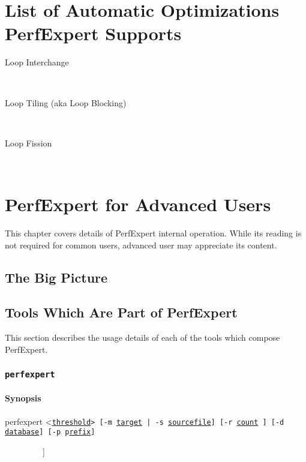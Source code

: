 \chapter{List of Automatic Optimizations PerfExpert Supports}

\begin{description}
	\item[Loop Interchange]\hfill \\
	\item[Loop Tiling (aka Loop Blocking)]\hfill \\
	\item[Loop Fission]\hfill \\

\end{description}

\chapter{PerfExpert for Advanced Users}

This chapter covers details of PerfExpert internal operation. While its reading is not required for common users, advanced user may appreciate its content.

\section{The Big Picture}

\section{Tools Which Are Part of PerfExpert}

This section describes the usage details of each of the tools which compose PerfExpert.

\subsection{\texttt{perfexpert}}

\subsubsection{Synopsis}


\btt perfexpert <\tt\underline{threshold}\btt> [-m \tt\underline{tar}g\underline{et} \btt | -s \tt\underline{sourcefile}\btt] [-r \tt\underline{count} \btt] [-d \tt\underline{database}\btt] [-p \tt p\underline{refix}\btt]\par
\ \ \ \ \ \ \ \ \  \btt[-k \tt\underline{card} \btt[-P \tt p\underline{refix}\btt] [-B \tt\underline{before}\btt] [-A \tt\underline{after}\btt]]\par
\ \ \ \ \ \ \ \ \ \btt[-gchv]\par
\normalfont

